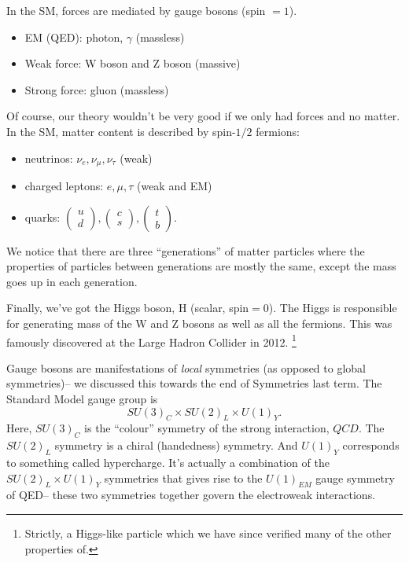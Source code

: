 In the SM, forces are mediated by gauge bosons (spin $=1$).
\begin{itemize}
    \item EM (QED): photon, $\gamma$ (massless)
    \item Weak force: W boson and Z boson (massive)
    \item Strong force: gluon (massless)
\end{itemize}
Of course, our theory wouldn't be very good if we only had forces and no matter. In the SM, matter content is described by spin-$1/2$ fermions:
\begin{itemize}
    \item neutrinos: $\nu_e, \nu_\mu, \nu_\tau$ (weak)
    \item charged leptons: $e,\mu,\tau$ (weak and EM)
    \item quarks: $
        \begin{pmatrix} u\\ d \end{pmatrix},
        \begin{pmatrix} c\\ s \end{pmatrix},
        \begin{pmatrix} t\\ b \end{pmatrix}.
    $
\end{itemize}
We notice that there are three ``generations'' of matter particles where the properties of particles between generations are mostly the same, except the mass goes up in each generation.

Finally, we've got the Higgs boson, H (scalar, spin$=0$). The Higgs is responsible for generating mass of the W and Z bosons as well as all the fermions. This was famously discovered at the Large Hadron Collider in 2012.%
    \footnote{Strictly, a Higgs-like particle which we have since verified many of the other properties of.}

Gauge bosons are manifestations of \emph{local} symmetries (as opposed to global symmetries)-- we discussed this towards the end of Symmetries last term. The Standard Model gauge group is
\begin{equation*}
    SU(3)_C \times SU(2)_L \times U(1)_Y.
\end{equation*}
Here, $SU(3)_C$ is the ``colour'' symmetry of the strong interaction, $QCD$. The $SU(2)_L$ symmetry is a chiral (handedness) symmetry. And $U(1)_Y$ corresponds to something called hypercharge. It's actually a combination of the $SU(2)_L\times U(1)_Y$ symmetries that gives rise to the $U(1)_{EM}$ gauge symmetry of QED-- these two symmetries together govern the electroweak interactions.

